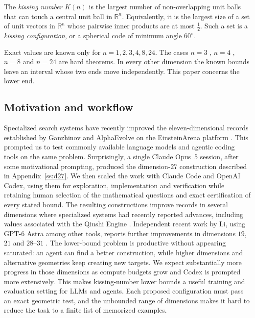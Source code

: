 \documentclass[11pt]{amsart}
\theoremstyle{remark}
\newcommand{\R}{\mathbb{R}}
\begin{document}
The \emph{kissing number} $K(n)$ is the largest number of non-overlapping unit
balls that can touch a central unit ball in $\R^n$. Equivalently, it is the
largest size of a set of unit vectors in $\R^n$ whose pairwise inner products
are at most $\tfrac12$. Such a set is a \emph{kissing configuration}, or a
spherical code of minimum angle $60^\circ$.

Exact values are known only for $n=1,2,3,4,8,24$. The cases $n=3$
\cite{schutte-vanderwaerden1953}, $n=4$ \cite{musin2008}, $n=8$ and $n=24$
\cite{odlyzko-sloane1979,levenshtein1979} are hard theorems. In every other
dimension the known bounds leave an interval whose two ends move independently.
This paper concerns the lower end.

\subsection{Motivation and workflow}

Specialized search systems have recently improved the eleven-dimensional records
established by Ganzhinov and AlphaEvolve on the EinsteinArena platform
\cite{ganzhinov2025,novikov-etal2025,bianchi-kwon-pappu-zou2026}. This prompted us to
test commonly available language models and agentic coding tools on the same
problem. Surprisingly, a single Claude Opus~5 session, after some motivational prompting,
produced the dimension-$27$ construction described in Appendix~\ref{ss:d27}. We
then scaled the work with
Claude Code and OpenAI Codex, using them for exploration, implementation and
verification while retaining human selection of the mathematical questions and
exact certification of every stated bound. The resulting constructions improve
records in several dimensions where specialized systems had recently reported
advances, including values associated with the Qiushi Engine \cite{yang-etal2026}.
Independent recent work by Li, using GPT-6 Astra among other tools,
reports further improvements in dimensions $19$, $21$ and $28$--$31$
\cite{kli19-21-2026,kli28-31-2026}.
The lower-bound problem is productive without appearing saturated: an agent can
find a better construction, while higher dimensions and alternative geometries
keep creating new targets. We expect substantially more progress in those
dimensions as compute budgets grow and Codex is prompted more extensively. This
makes kissing-number lower bounds a useful
training and evaluation setting for LLMs and agents. Each proposed configuration
must pass an exact geometric test, and the unbounded range of dimensions makes it
hard to reduce the task to a finite list of memorized examples.
\end{document}
